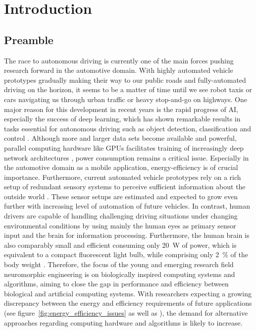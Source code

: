 \chapter{Introduction}%
\label{chap:introduction}

\section{Preamble}%
\label{sec:preamble}

The race to autonomous driving is currently one of the main forces pushing research forward in the automotive domain.
With highly automated vehicle prototypes gradually making their way to our public roads and fully-automated driving on the horizon, it seems to be a matter of time until we see robot taxis or cars navigating us through urban traffic or heavy stop-and-go on highways.
One major reason for this development in recent years is the rapid progress of \ac{AI}, especially the success of deep learning, which has shown remarkable results in tasks essential for autonomous driving such as object detection, classification \citep{Ciresan2012} and control \citep{Bojarski2016}.
Although more and larger data sets \citep{Geiger2013a, Cordts2016} become available and powerful, parallel computing hardware like \acp{GPU} facilitates training of increasingly deep network architectures \citep{Simonyan2014}, power consumption remains a critical issue.
Especially in the automotive domain as a mobile application, energy-efficiency is of crucial importance.
Furthermore, current automated vehicle prototypes rely on a rich setup of redundant sensory systems to perceive sufficient information about the outside world \citep{Aeberhard2015}.
These sensor setups are estimated and expected to grow even further with increasing level of automation of future vehicles.
In contrast, human drivers are capable of handling challenging driving situations under changing environmental conditions by using mainly the human eyes as primary sensor input and the brain for information processing.
Furthermore, the human brain is also comparably small and efficient consuming only \SI{20}{\watt} of power, which is equivalent to a compact fluorescent light bulb, while comprising only \SI{2}{\percent} of the body weight \citep[Chap. 2.1]{Eliasmith2013}.
Therefore, the focus of the young and emerging research field neuromorphic engineering is on biologically inspired computing systems and algorithms, aiming to close the gap in performance and efficiency between biological and artificial computing systems.
With researchers expecting a growing discrepancy between the energy and efficiency requirements of future applications (see figure~\ref{fig:energy_efficiency_issues} as well as \citet{Marr2013, Farahini2016, Akopyan2015}), the demand for alternative approaches regarding computing hardware and algorithms is likely to increase.
